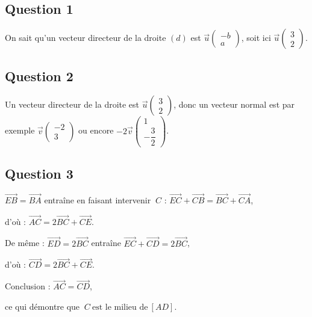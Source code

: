 \subsection*{Question 1}

On sait qu'un vecteur directeur de la droite \((\textit{d})\) est \(\vec{u} \begin{pmatrix} -b \\ a \end{pmatrix}\), soit ici \(\vec{u} \begin{pmatrix} 3 \\ 2 \end{pmatrix}\).

\subsection*{Question 2}

Un vecteur directeur de la droite est \(\vec{u} \begin{pmatrix} 3 \\ 2 \end{pmatrix}\), donc un vecteur normal est par exemple \(\vec{v} \begin{pmatrix} -2 \\ 3 \end{pmatrix}\) ou encore \(-2 \vec{v} \begin{pmatrix} 1 \\ -\dfrac{3}{2} \end{pmatrix}\).

\subsection*{Question 3}

\(\overrightarrow{EB} = \overrightarrow{BA}\) entraîne en faisant intervenir \(\ C\) :
\(\overrightarrow{EC} + \overrightarrow{CB} = \overrightarrow{BC} + \overrightarrow{CA}\),

d'où : \(\overrightarrow{AC} = 2 \overrightarrow{BC} + \overrightarrow{CE}\).

De même : \(\overrightarrow{ED} = 2 \overrightarrow{BC}\) entraîne \(\overrightarrow{EC} + \overrightarrow{CD} = 2 \overrightarrow{BC}\),

d'où : \(\overrightarrow{CD} = 2 \overrightarrow{BC} + \overrightarrow{CE}\).

Conclusion : \(\overrightarrow{AC} = \overrightarrow{CD}\),

ce qui démontre que \(\ C \ \text{est le milieu de} \ [AD]\).

